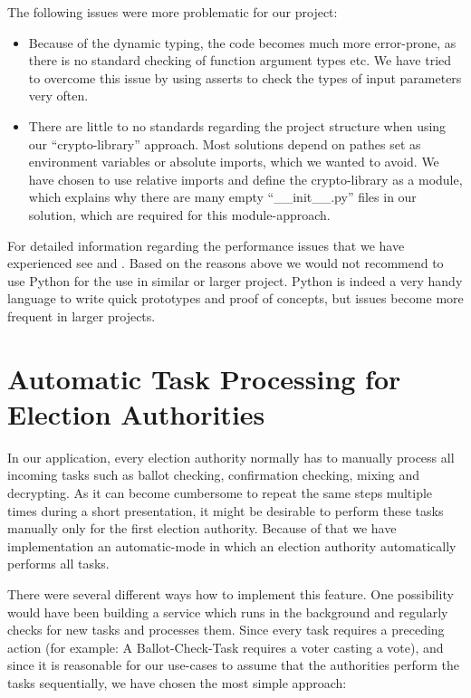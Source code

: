 The following issues were more problematic for our project:
\begin{itemize}
	\item Because of the dynamic typing, the code becomes much more error-prone, as there is no standard checking of function argument types etc. We have tried to overcome this issue by using asserts to check the types of input parameters very often.
	\item There are little to no standards regarding the project structure when using our "`crypto-library"' approach. Most solutions depend on pathes set as environment variables or absolute imports, which we wanted to avoid. We have chosen to use relative imports and define the crypto-library as a module, which explains why there are many empty "`\_\_init\_\_.py"' files in our solution, which are required for this module-approach.
\end{itemize}

For detailed information regarding the performance issues that we have experienced see \cite{slowpy} and \cite{slowpy2}. Based on the reasons above we would not recommend to use Python for the use in similar or larger project. Python is indeed a very handy language to write quick prototypes and proof of concepts, but issues become more frequent in larger projects.

\section{Automatic Task Processing for Election Authorities}
In our application, every election authority normally has to manually process all incoming tasks such as ballot checking, confirmation checking, mixing and decrypting. As it can become cumbersome to repeat the same steps multiple times during a short presentation, it might be desirable to perform these tasks manually only for the first election authority. Because of that we have implementation an automatic-mode in which an election authority automatically performs all tasks.

There were several different ways how to implement this feature. One possibility would have been building a service which runs in the background and regularly checks for new tasks and processes them. Since every task requires a preceding action (for example: A Ballot-Check-Task requires a voter casting a vote), and since it is reasonable for our use-cases to assume that the authorities perform the tasks sequentially, we have chosen the most simple approach:

